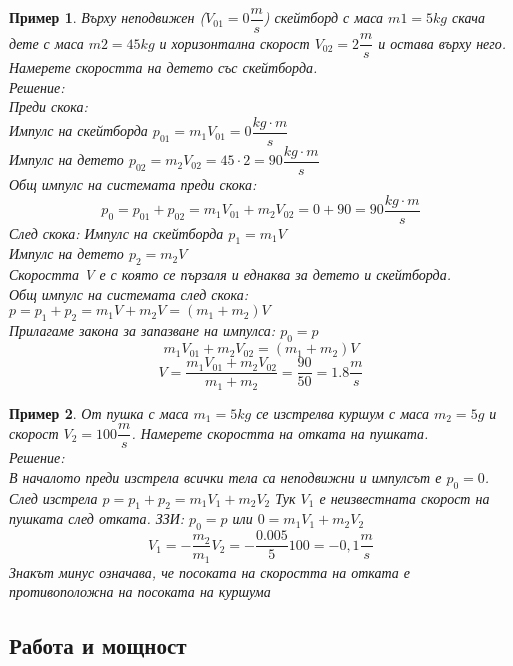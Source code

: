 \documentclass[fleqn, 12pt]{article}
\newtheorem{example}{Пример}[subsection]
\begin{document}
\begin{example}
Върху неподвижен ($V_{01} = 0 \dfrac{m}{s}$) скейтборд с маса $m1 = 5 kg$ скача дете с маса $m2 = 45 kg$ и хоризонтална скорост
$V_{02} = 2 \dfrac{m}{s}$ и остава върху него. Намерете скоростта на детето със скейтборда.\\
Решение: \\
Преди скока:\\
Импулс на скейтборда $p_{01} = m_1 V_{01} = 0 \dfrac{kg \cdot m}{s}$ \\
Импулс на детето $p_{02} = m_2 V_{02} = 45 \cdot 2 = 90 \dfrac{kg \cdot m}{s} $ \\
Общ импулс на системата преди скока:
$$p_0 = p_{01} + p_{02} = m_1 V_{01} + m_2 V_{02} = 0 + 90 = 90 \dfrac{kg \cdot m}{s}$$
След скока:  
Импулс на скейтборда $p_1 = m_1 V $ \\
Импулс на детето $p_2 = m_2 V $\\
Скоростта V е с която се пързаля и еднаква за детето и скейтборда. \\
Общ импулс на системата след скока: $p = p_1 + p_2 = m_1 V +  m_2 V  = (m_1 + m_2)V$ \\
Прилагаме закона за запазване на импулса: $p_0 = p$
$$m_1 V_{01} + m_2 V_{02} = (m_1 + m_2)V $$
$$V = \dfrac{m_1 V_{01} + m_2 V_{02}}{m_1 + m_2} = \dfrac{90}{50} = 1.8 \dfrac{m}{s}$$

\end{example}

\begin{example}
От пушка с маса $m_1 = 5 kg$ се изстрелва куршум с маса $m_2 = 5 g$ и скорост $V_2 = 100 \dfrac{m}{s}$. Намерете скоростта на отката на пушката. \\
Решение: \\
В началото преди изстрела всички тела са неподвижни и импулсът е $p_0 = 0$. След изстрела $p = p_1 + p_2 = m_1V_1 + m_2V_2$ Тук $V_1$ е неизвестната скорост на пушката след отката. 
ЗЗИ: $p_0 = p$ или $0 =m_1V_1 + m_2V_2$
$$V_1 = -\dfrac{m_2}{m_1} V_2 = -\dfrac{0.005}{5} 100 = -0,1 \dfrac{m}{s}$$
Знакът минус означава, че посоката на скоростта на отката е противоположна на посоката на куршума
\end{example}

\subsection{Работа и мощност}
\end{document}
